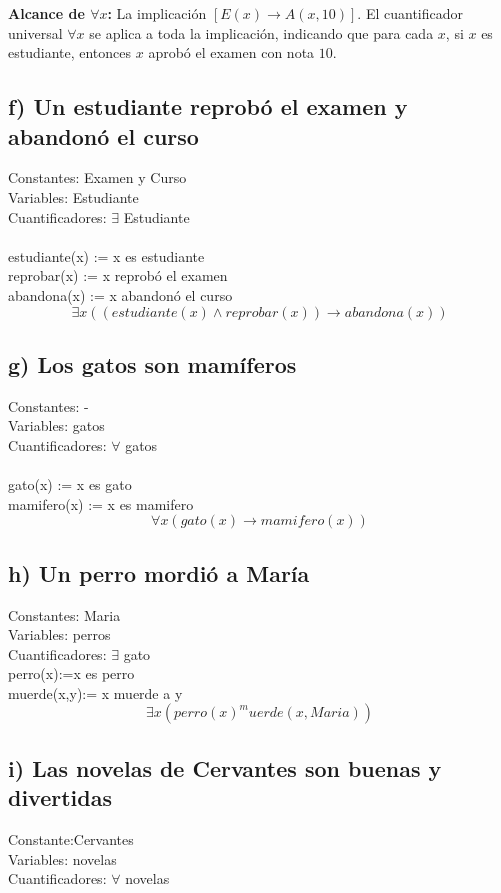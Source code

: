 \documentclass[11pt,letterpaper]{article}
\begin{document}
\textbf{Alcance de \( \forall x \):}
La implicación \( [E(x) \to A(x, 10)] \). El cuantificador universal \( \forall x \) se aplica a toda la implicación, indicando que para cada \( x \), si \( x \) es estudiante, entonces \( x \) aprobó el examen con nota \( 10 \).
\subsection*{f) Un estudiante reprobó el examen y abandonó el curso}
Constantes: Examen y Curso\\
Variables: Estudiante\\
Cuantificadores: $\exists$ Estudiante\\ \\

estudiante(x) := x es estudiante\\
reprobar(x) := x reprobó el examen\\
abandona(x) := x abandonó el curso\\
$$ \exists x ((estudiante(x) \land reprobar(x)) \rightarrow abandona(x))$$

\subsection*{g) Los gatos son mamíferos}
Constantes: -\\
Variables: gatos\\
Cuantificadores: $\forall$ gatos \\ \\

gato(x) := x es gato\\
mamifero(x) := x es mamifero\\
$$ \forall x (gato(x) \rightarrow mamifero(x))$$

\subsection*{h) Un perro mordió a María}
Constantes: Maria\\
Variables: perros\\
Cuantificadores: $\exists$ gato \\
perro(x):=x es perro\\
muerde(x,y):= x muerde a y\\
$$\exists x (perro(x)^muerde(x,Maria))$$

\subsection*{i) Las novelas de Cervantes son buenas y divertidas}
Constante:Cervantes \\
Variables: novelas\\
Cuantificadores: $\forall $ novelas\\
\end{document}

